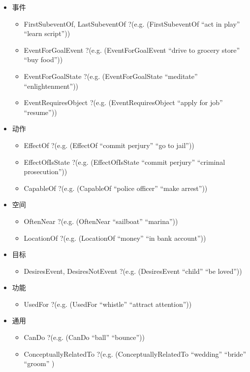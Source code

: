 \begin{enumerate}
\begin{description}
\begin{itemize}
\item 事件
\begin{itemize}
\item FirstSubeventOf, LastSubeventOf ?(e.g. (FirstSubeventOf ``act in play'' ``learn script''))
\item EventForGoalEvent ?(e.g. (EventForGoalEvent ``drive to grocery store'' ``buy food''))
\item EventForGoalState ?(e.g. (EventForGoalState ``meditate'' ``enlightenment''))
\item EventRequiresObject ?(e.g. (EventRequiresObject ``apply for job'' ``resume''))
\end{itemize}

\item 动作
\begin{itemize}
\item EffectOf ?(e.g. (EffectOf ``commit perjury'' ``go to jail''))
\item EffectOfIsState ?(e.g. (EffectOfIsState ``commit perjury'' ``criminal prosecution''))
\item CapableOf ?(e.g. (CapableOf ``police officer'' ``make arrest''))
\end{itemize}

\item 空间
\begin{itemize}
\item OftenNear ?(e.g. (OftenNear ``sailboat'' ``marina''))
\item LocationOf ?(e.g. (LocationOf ``money'' ``in bank account''))
\end{itemize}

\item 目标
\begin{itemize}
\item DesiresEvent, DesiresNotEvent ?(e.g. (DesiresEvent ``child'' ``be loved''))
\end{itemize}

\item 功能
\begin{itemize}
\item UsedFor ?(e.g. (UsedFor ``whistle'' ``attract attention''))
\end{itemize}

\item 通用
\begin{itemize}
\item CanDo ?(e.g. (CanDo ``ball'' ``bounce''))
\item ConceptuallyRelatedTo ?(e.g. (ConceptuallyRelatedTo ``wedding'' ``bride'' ``groom'' )
\end{itemize}
\end{itemize}


\end{description}
\end{enumerate}
